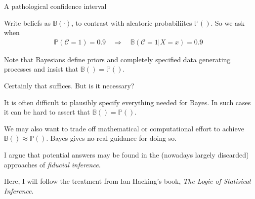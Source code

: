 \documentclass[8pt]{beamer}\usepackage[]{graphicx}\usepackage[]{color}
\def\p#1{\mathbb{P}\left(#1\right)}
\def\b#1{\mathbb{B}\left(#1\right)}
\def\cover{\mathcal{C}}
\begin{document}
\begin{frame}{A pathological confidence interval}

Write beliefs as $\b{\cdot}$, to contrast with aleatoric
probabiliites $\p{}$. So we ask when
%
\begin{align*}
%
\p{\cover = 1} = 0.9 \quad \Rightarrow \quad
\b{\cover = 1 | X = x} = 0.9
%
\end{align*}

\pause

\hrulefill

Note that Bayesians define priors and completely specified
data generating processes and insist that $\b{} = \p{}$.

Certainly that suffices.  But is it necessary?

\pause

It is often difficult to plausibly specify
everything needed for Bayes.  In such cases it can be hard to
assert that $\b{} = \p{}$.

\pause

We may also want to trade off mathematical or computational effort to achieve
$\b{} \approx \p{}$.  Bayes gives no real guidance for doing so.

\pause

I argue that potential answers may be found in the (nowadays largely discarded)
approaches of {\em fiducial inference}.

Here, I will follow the treatment from Ian Hacking's book, {\em The Logic of
Statisical Inference}.

\end{frame}


\end{document}
